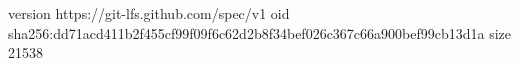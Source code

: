 version https://git-lfs.github.com/spec/v1
oid sha256:dd71acd411b2f455cf99f09f6c62d2b8f34bef026c367c66a900bef99cb13d1a
size 21538
